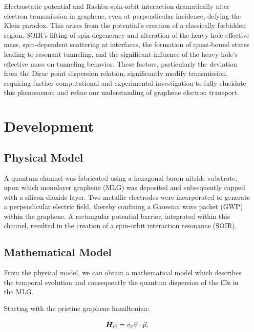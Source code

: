 \documentclass[twocolumn]{revtex4-2}
\newcommand{\bn}[1]{\mbox{\boldmath $#1$}}
\def\mb{\mbox}
\begin{document}
    Electrostatic potential and Rashba spin-orbit interaction dramatically alter electron transmission in graphene, even at perpendicular incidence, defying the Klein paradox.
     This arises from the potential's creation of a classically forbidden region, SOIR's lifting of spin degeneracy and alteration of the heavy hole effective mass, spin-dependent scattering at interfaces, the formation of quasi-bound states leading to resonant tunneling, and the significant influence of the heavy hole's effective mass on tunneling behavior.
      These factors, particularly the deviation from the Dirac point dispersion relation, significantly modify transmission, requiring further computational and experimental investigation to fully elucidate this phenomenon and refine our understanding of graphene electron transport.

    \section{Development}\label{sec:development}

    \subsection{Physical Model}\label{subsec:physical-model}

    A quantum channel was fabricated using a hexagonal boron nitride substrate, upon which monolayer graphene (MLG) was deposited and subsequently capped with a silicon dioxide layer.
     Two metallic electrodes were incorporated to generate a perpendicular electric field, thereby confining a Gaussian wave packet (GWP) within the graphene.
      A rectangular potential barrier, integrated within this channel, resulted in the creation of a spin-orbit interaction resonance (SOIR).


    \subsection{Mathematical Model}\label{subsec:mathematical-model}

    From the physical model, we can obtain a mathematical model which describes the temporal evolution and consequently the quantum dispersion of the fDs in the MLG.

    Starting with the pristine graphene hamiltonian\cite{Geimk2007}:

    \begin{equation}
        \label{eq:pristGr}
        \hat{\bn{H}}_G = v_{\mb{\tiny F}}\vec{\mathbf{\sigma}}\cdot\vec{p},
    \end{equation}
\end{document}
